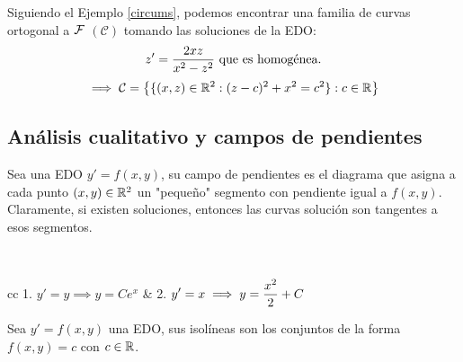\documentclass[12pt]{article}
\begin{document}
\begin{ejem}
    Siguiendo el Ejemplo \ref{circums}, podemos encontrar una familia de curvas ortogonal a $\mathcal{F}$ $(\mathcal{C})$ tomando las soluciones de la EDO:
    \[\displaystyle z'=\frac{2xz}{x^2-z^2} \text{ que es homogénea.}\]
    \[\implies \mathcal{C} =\left\{\{(x,z)\in \mathbb{R}^2 : (z-c)^2+x^2=c^2\} : c\in\mathbb{R}\right\}\]
    \begin{figure}[htbp]
        \centering
        \vspace{-0.7cm} %
        
        \vspace{-0.2cm} %
    \end{figure}
\end{ejem}

\subsection{Análisis cualitativo y campos de pendientes}
\begin{defn}
    Sea una EDO $y'=f(x,y)$, su campo de pendientes es el diagrama que asigna a cada punto $(x,y)\in \mathbb{R}^2$ un "pequeño" segmento con pendiente igual a $f(x,y)$. Claramente, si existen soluciones, entonces las curvas solución son tangentes a esos segmentos.
\end{defn}

\begin{ejem}\mbox{}\\
    \hspace{-1cm}
    \begin{tabular}{cc}
        1. $y'=y \implies y=Ce^x$ & 2. $\displaystyle y'=x \implies y=\frac{x^2}{2}+C$ \\
        \ifdraft{\framebox(7cm,7cm){} & \framebox(7cm,7cm){}}{&}
    \end{tabular}
\end{ejem}

\begin{defn}[Isolínea]
    Sea $y'=f(x,y)$ una EDO, sus isolíneas son los conjuntos de la forma $f(x, y)=c$ con $c\in \mathbb{R}$.
\end{defn}
\end{document}
